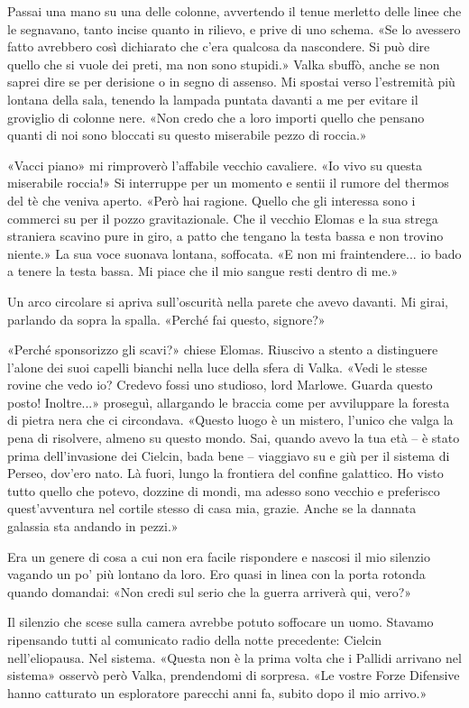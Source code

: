 Passai una mano su una delle colonne, avvertendo il tenue merletto delle
linee che le segnavano, tanto incise quanto in rilievo, e prive di uno
schema. «Se lo avessero fatto avrebbero così dichiarato che c'era
qualcosa da nascondere. Si può dire quello che si vuole dei preti, ma
non sono stupidi.» Valka sbuffò, anche se non saprei dire se per
derisione o in segno di assenso. Mi spostai verso l'estremità più
lontana della sala, tenendo la lampada puntata davanti a me per evitare
il groviglio di colonne nere. «Non credo che a loro importi quello che
pensano quanti di noi sono bloccati su questo miserabile pezzo di
roccia.»

«Vacci piano» mi rimproverò l'affabile vecchio cavaliere. «Io vivo su
questa miserabile roccia!» Si interruppe per un momento e sentii il
rumore del thermos del tè che veniva aperto. «Però hai ragione. Quello
che gli interessa sono i commerci su per il pozzo gravitazionale. Che il
vecchio Elomas e la sua strega straniera scavino pure in giro, a patto
che tengano la testa bassa e non trovino niente.» La sua voce suonava
lontana, soffocata. «E non mi fraintendere... io bado a tenere la testa
bassa. Mi piace che il mio sangue resti dentro di me.»

Un arco circolare si apriva sull'oscurità nella parete che avevo
davanti. Mi girai, parlando da sopra la spalla. «Perché fai questo,
signore?»

«Perché sponsorizzo gli scavi?» chiese Elomas. Riuscivo a stento a
distinguere l'alone dei suoi capelli bianchi nella luce della sfera di
Valka. «Vedi le stesse rovine che vedo io? Credevo fossi uno studioso,
lord Marlowe. Guarda questo posto! Inoltre...» proseguì, allargando le
braccia come per avviluppare la foresta di pietra nera che ci
circondava. «Questo luogo è un mistero, l'unico che valga la pena di
risolvere, almeno su questo mondo. Sai, quando avevo la tua età -- è
stato prima dell'invasione dei Cielcin, bada bene -- viaggiavo su e giù
per il sistema di Perseo, dov'ero nato. Là fuori, lungo la frontiera del
confine galattico. Ho visto tutto quello che potevo, dozzine di mondi,
ma adesso sono vecchio e preferisco quest'avventura nel cortile stesso
di casa mia, grazie. Anche se la dannata galassia sta andando in pezzi.»

Era un genere di cosa a cui non era facile rispondere e nascosi il mio
silenzio vagando un po' più lontano da loro. Ero quasi in linea con la
porta rotonda quando domandai: «Non credi sul serio che la guerra
arriverà qui, vero?»

Il silenzio che scese sulla camera avrebbe potuto soffocare un uomo.
Stavamo ripensando tutti al comunicato radio della notte precedente:
Cielcin nell'eliopausa. Nel sistema. «Questa non è la prima volta che i
Pallidi arrivano nel sistema» osservò però Valka, prendendomi di
sorpresa. «Le vostre Forze Difensive hanno catturato un esploratore
parecchi anni fa, subito dopo il mio arrivo.»

